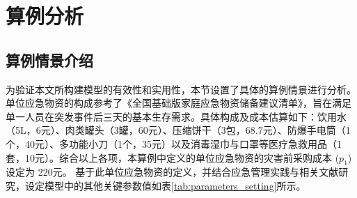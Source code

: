 \documentclass[a4paper,8pt,twocolumn]{article} %
\begin{document}
\section{算例分析}
\subsection{算例情景介绍}
为验证本文所构建模型的有效性和实用性，本节设置了具体的算例情景进行分析。单位应急物资的构成参考了《全国基础版家庭应急物资储备建议清单》\cite{china_emergency_management_2020}，旨在满足单一人员在突发事件后三天的基本生存需求。具体构成及成本估算如下：饮用水（5L，6元）、肉类罐头（3罐，60元）、压缩饼干（3包，68.7元）、防爆手电筒（1个，40元）、多功能小刀（1个，35元）以及消毒湿巾与口罩等医疗急救用品（1套，10元）。综合以上各项，本算例中定义的单位应急物资的灾害前采购成本 ($p_1$) 设定为 220元。
基于此单位应急物资的定义，并结合应急管理实践与相关文献研究，设定模型中的其他关键参数值如表\ref{tab:parameters_setting}所示。
\end{document}
